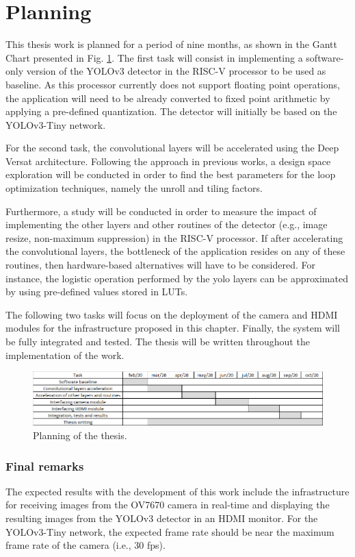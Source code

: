 \section{Planning}
\label{section:planning}

This thesis work is planned for a period of nine months, as shown in the Gantt Chart presented in Fig. \ref{fig:planning}. The first task will consist in implementing a software-only version of the YOLOv3 detector in the RISC-V processor to be used as baseline. As this processor currently does not support floating point operations, the application will need to be already converted to fixed point arithmetic by applying a pre-defined quantization. The detector will initially be based on the YOLOv3-Tiny network.

For the second task, the convolutional layers will be accelerated using the Deep Versat architecture. Following the approach in previous works, a design space exploration will be conducted in order to find the best parameters for the loop optimization techniques, namely the unroll and tiling factors.

Furthermore, a study will be conducted in order to measure the impact of implementing the other layers and other routines of the detector (e.g., image resize, non-maximum suppression) in the RISC-V processor. If after accelerating the convolutional layers, the bottleneck of the application resides on any of these routines, then hardware-based alternatives will have to be considered. For instance, the logistic operation performed by the yolo layers can be approximated by using pre-defined values stored in LUTs. 

The following two tasks will focus on the deployment of the camera and HDMI modules for the infrastructure proposed in this chapter. Finally, the system will be fully integrated and tested. The thesis will be written throughout the implementation of the work. 

\begin{figure}[!htb]
  \centering
  \includegraphics[width=\textwidth]{Figures/gantt.png}
  \caption{Planning of the thesis.}
  \label{fig:planning}
\end{figure}

\subsubsection{Final remarks}

The expected results with the development of this work include the infrastructure for receiving images from the OV7670 camera in real-time and displaying the resulting images from the YOLOv3 detector in an HDMI monitor. For the YOLOv3-Tiny network, the expected frame rate should be near the maximum frame rate of the camera (i.e., 30 fps).  